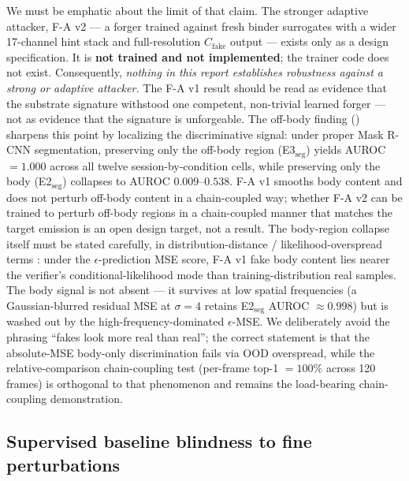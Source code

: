 We must be emphatic about the limit of that claim. The stronger adaptive attacker, F-A v2 --- a forger trained against fresh binder surrogates with a wider 17-channel hint stack and full-resolution $C_\text{fake}$ output --- exists only as a design specification. It is \textbf{not trained and not implemented}; the trainer code does not exist. Consequently, \emph{nothing in this report establishes robustness against a strong or adaptive attacker.} The F-A v1 result should be read as evidence that the substrate signature withstood one competent, non-trivial learned forger --- not as evidence that the signature is unforgeable. The off-body finding () sharpens this point by localizing the discriminative signal: under proper Mask R-CNN segmentation, preserving only the off-body region (E3$_{\mathrm{seg}}$) yields AUROC $=1.000$ across all twelve session-by-condition cells, while preserving only the body (E2$_{\mathrm{seg}}$) collapses to AUROC $0.009$--$0.538$. F-A v1 smooths body content and does not perturb off-body content in a chain-coupled way; whether F-A v2 can be trained to perturb off-body regions in a chain-coupled manner that matches the target emission is an open design target, not a result. The body-region collapse itself must be stated carefully, in distribution-distance / likelihood-overspread terms \cite{nalisnick2019}: under the $\epsilon$-prediction MSE score, F-A v1 fake body content lies nearer the verifier's conditional-likelihood mode than training-distribution real samples. The body signal is not absent --- it survives at low spatial frequencies (a Gaussian-blurred residual MSE at $\sigma=4$ retains E2$_{\mathrm{seg}}$ AUROC $\approx 0.998$) but is washed out by the high-frequency-dominated $\epsilon$-MSE. We deliberately avoid the phrasing ``fakes look more real than real''; the correct statement is that the absolute-MSE body-only discrimination fails via OOD overspread, while the relative-comparison chain-coupling test (per-frame top-1 $=100\%$ across 120 frames) is orthogonal to that phenomenon and remains the load-bearing chain-coupling demonstration.

\subsection{Supervised baseline blindness to fine perturbations}\label{sec:discussion:baseline}

